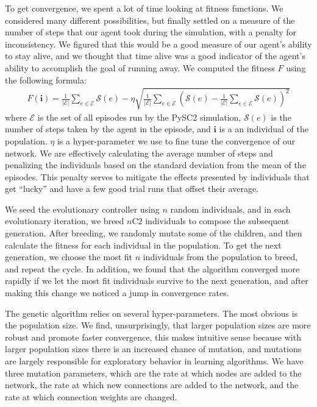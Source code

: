 \documentclass{article}
\begin{document}
To get convergence, we spent a lot of time looking at fitness functions. We
considered many different possibilities, but finally settled on a measure of the
number of steps that our agent took during the simulation, with a penalty for
inconsistency. We figured that this would be a good measure of our agent's
ability to stay alive, and we thought that time alive was a good indicator of
the agent's ability to accomplish the goal of running away. We computed the
fitness $F$ using the following formula:
\begin{align}\label{eq:fitness}
  F(\bm{i}) = \frac{1}{|\bm{\mathcal{E}}|} \sum_{e
\in \bm{\mathcal{E}}} \mathcal{S}(e) - \eta\sqrt{\frac{1}{|\bm{\mathcal{E}}|}
\sum_{e \in \bm{\mathcal{E}}}\left(\mathcal{S}(e) - \frac{1}{|\bm{\mathcal{E}}|}
\sum_{e \in \bm{\mathcal{E}}} \mathcal{S}(e)\right)^2}
\end{align}
where $\bm{\mathcal{E}}$ is the set of all episodes run by the PySC2
simulation, $\mathcal{S}(e)$ is the number of steps taken by the agent in the
episode, and $\bm{i}$ is a an individual of the population. $\eta$ is a
hyper-parameter we use to fine tune the convergence of our network. We are
effectively calculating the average number of steps and penalizing the
individuals based on the standard deviation from the mean of the episodes. This
penalty serves to mitigate the effects presented by individuals that get
``lucky'' and have a few good trial runs that offset their average.

We seed the evolutionary controller using $n$ random individuals, and in each
evolutionary iteration, we breed $n\text{C}2$ individuals to compose the
subsequent generation. After breeding, we randomly mutate some of the children,
and then calculate the fitness for each individual in the population. To get the
next generation, we choose the most fit $n$ individuals from the population to
breed, and repeat the cycle. In addition, we found that the algorithm converged
more rapidly if we let the most fit individuals survive to the next generation,
and after making this change we noticed a jump in convergence rates.

The genetic algorithm relies on several hyper-parameters. The most obvious is
the population size. We find, unsurprisingly, that larger population sizes are
more robust and promote faster convergence, this makes intuitive sense because
with larger population sizes there is an increased chance of mutation, and
mutations are largely responsible for exploratory behavior in learning
algorithms. We have three mutation parameters, which are the rate at which nodes
are added to the network, the rate at which new connections are added to the
network, and the rate at which connection weights are changed.
\end{document}
